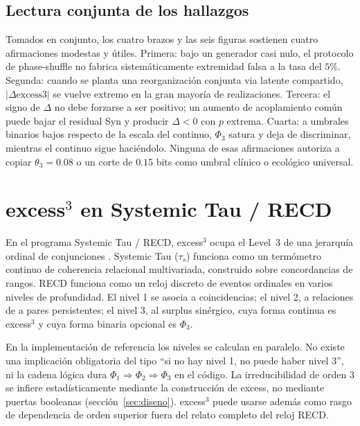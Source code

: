 \documentclass[11pt,a4paper]{article}
\begin{document}
\subsection{Lectura conjunta de los hallazgos}

Tomados en conjunto, los cuatro brazos y las seis figuras sostienen cuatro
afirmaciones modestas y \'utiles. Primera: bajo un generador casi nulo, el
protocolo de phase-shuffle no fabrica sistem\'aticamente extremidad falsa a
la tasa del $5\%$. Segunda: cuando se planta una reorganizaci\'on conjunta
via latente compartido, $|\Delta\mathrm{excess3}|$ se vuelve extremo en la
gran mayor\'ia de realizaciones. Tercera: el signo de $\Delta$ no debe
forzarse a ser positivo; un aumento de acoplamiento com\'un puede bajar el
residual Syn y producir $\Delta<0$ con $p$ extrema. Cuarta: a umbrales
binarios bajos respecto de la escala del continuo, $\Phi_3$ satura y deja de
discriminar, mientras el continuo sigue haci\'endolo. Ninguna de esas
afirmaciones autoriza a copiar $\theta_3=0.08$ o un corte de $0.15$ bits
como umbral cl\'inico o ecol\'ogico universal.

\section{excess$^3$ en Systemic Tau / RECD}
\label{sec:recd}

En el programa Systemic Tau / RECD, excess$^3$ ocupa el Level~3 de una
jerarqu\'ia ordinal de conjunciones \citep{Padilla2026framework}. Systemic
Tau ($\tau_s$) funciona como un term\'ometro continuo de coherencia
relacional multivariada, construido sobre concordancias de rangos. RECD
funciona como un reloj discreto de eventos ordinales en varios niveles de
profundidad. El nivel 1 se asocia a coincidencias; el nivel 2, a relaciones
de a pares persistentes; el nivel 3, al surplus sin\'ergico, cuya forma
continua es excess$^3$ y cuya forma binaria opcional es $\Phi_3$.

En la implementaci\'on de referencia los niveles se calculan en paralelo. No
existe una implicaci\'on obligatoria del tipo ``si no hay nivel 1, no puede
haber nivel 3'', ni la cadena l\'ogica dura
$\Phi_1\Rightarrow\Phi_2\Rightarrow\Phi_3$ en el c\'odigo. La irreducibilidad
de orden 3 se infiere estad\'isticamente mediante la construcci\'on de excess,
no mediante puertas booleanas (secci\'on~\ref{sec:diseno}). excess$^3$ puede
usarse adem\'as como rasgo de dependencia de orden superior fuera del relato
completo del reloj RECD.
\end{document}
